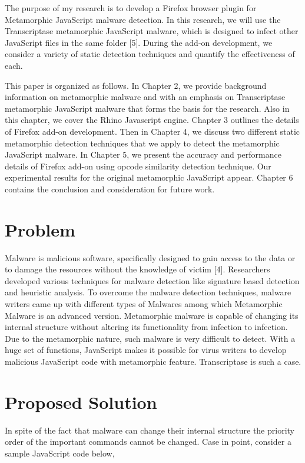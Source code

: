 The purpose of my research is to develop a Firefox browser plugin for Metamorphic JavaScript malware detection. In this research, we will use the Transcriptase metamorphic JavaScript malware, which is designed to infect other JavaScript files in the same folder [5]. During the add-on development, we consider a variety of static detection techniques and quantify the effectiveness of each. 

This paper is organized as follows. In Chapter 2, we provide background information on metamorphic malware and with an emphasis on Transcriptase metamorphic JavaScript malware that forms the basis for the research. Also in this chapter, we cover the Rhino Javascript engine. Chapter 3 outlines the details of Firefox add-on development. Then in Chapter 4, we discuss two different static metamorphic detection techniques that we apply to detect the metamorphic JavaScript malware. In Chapter 5, we present the accuracy and performance details of Firefox add-on using opcode similarity detection technique. Our experimental results for the original metamorphic JavaScript appear. Chapter 6 contains the conclusion and consideration for future work.

\section{Problem} 

Malware is malicious software, specifically designed to gain access to the data or to damage the resources without the knowledge of victim [4]. Researchers developed various techniques for malware detection like signature based detection and heuristic analysis. To overcome the malware detection techniques, malware writers came up with different types of Malwares among which Metamorphic Malware is an advanced version. Metamorphic malware is capable of changing its internal structure without altering its functionality from infection to infection. Due to the metamorphic nature, such malware is very difficult to detect. With a huge set of functions, JavaScript makes it possible for virus writers to develop malicious JavaScript code with metamorphic feature. Transcriptase is such a case.

\section{Proposed Solution}

In spite of the fact that malware can change their internal structure the priority order of the important commands cannot be changed. Case in point, consider a sample JavaScript code below,

